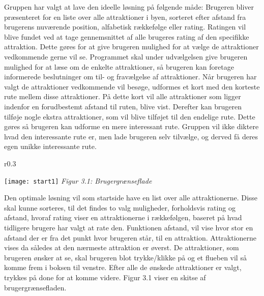 Gruppen har valgt at lave den ideelle løsning på følgende måde:\newline
\newline
Brugeren bliver præsenteret for en liste over alle attraktioner i byen, sorteret efter afstand fra brugerens nuværende position, alfabetisk rækkefølge eller rating. \newline
Ratingen vil blive fundet ved at tage gennemsnittet af alle brugeres rating af den specifikke attraktion. Dette gøres for at give brugeren mulighed for at vælge de attraktioner vedkommende gerne vil se.
\newline
Programmet skal under udvælgelsen give brugeren mulighed for at læse om de enkelte attraktioner, så brugeren kan foretage informerede beslutninger om til- og fravælgelse af attraktioner.\newline
\newline
Når brugeren har valgt de attraktioner vedkommende vil besøge, udformes et kort med den korteste rute mellem disse attraktioner. På dette kort vil alle attraktioner som ligger indenfor en forudbestemt afstand til ruten, blive vist. Derefter kan brugeren tilføje nogle ekstra attraktioner, som vil blive tilføjet til den endelige rute.\newline
Dette gøres så brugeren kan udforme en mere interessant rute. Gruppen vil ikke diktere hvad den interessante rute er, men lade brugeren selv tilvælge, og derved få deres egen unikke interessante rute. \newline 


\begin{wrapfigure}{r}{0.3\textwidth}
	\vspace{-20pt}
	\begin{center}
		\texttt{[image: start1]} \newline
		\textit{Figur 3.1: Brugergrænseflade}\newline
	\end{center}
	\vspace{-20pt}
	\vspace{-20pt}
\end{wrapfigure}


Den optimale løsning vil som startside have en list over alle attraktionerne. Disse skal kunne sorteres, til det findes to valg muligheder, forholdsvis rating og afstand, hvoraf rating viser en attraktionerne i rækkefølgen, baseret på hvad tidligere brugere har valgt at rate den. Funktionen afstand, vil vise hvor stor en afstand der er fra det punkt hvor brugeren står, til en attraktion. Attraktionerne vises da således at den nærmeste attraktion er øverst. De attraktioner, som brugeren ønsker at se, skal brugeren blot trykke/klikke på og et flueben vil så komme frem i boksen til venstre. Efter alle de ønskede attraktioner er valgt, trykkes på done for at komme videre. Figur 3.1 viser en skitse af brugergrænsefladen. \newline
\newline
\newline
\newline

